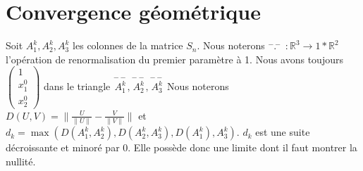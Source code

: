 \documentclass[12pt]{article}
\theoremstyle{plain}%
\theoremstyle{definition}
\theoremstyle{remark}
\begin{document}
\section{Convergence géométrique}

Soit $A_1^k,A_2^k,A_3^k$ les colonnes de la matrice $S_n$.
Nous noterons $\overset{--}{.}$
$:\mathbb{R}^3 \to {1}*\mathbb{R}^2$
 l'opération de renormalisation du premier paramètre à 1. Nous avons toujours $\begin{pmatrix} 1 \\ x_1^0 \\ x_2^0 \end{pmatrix}$ dans le triangle
 $\overset{--}{A_1^k},\overset{--}{A_2^k},\overset{--}{A_3^k}$
 Nous noterons $D(U,V)=\|\frac{U}{\|U \|}- \frac{V}{\|V\|}\|$ et $d_k=\max(D(A_1^k,A_2^k),D(A_2^k,A_3^k),D(A_1^k),A_3^k)$. $d_k$ est une suite décroissante et minoré par $0$. Elle possède donc une limite dont il faut montrer la nullité.
\end{document}
